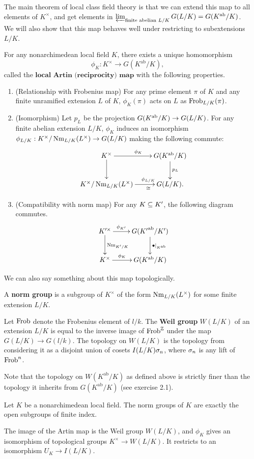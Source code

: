 The main theorem of local class field theory is that we can extend this map to all elements of $K^{\times}$, and get elements in $\varprojlim_{\text{finite abelian }L/K}G(L/K)=G(K^{\text{ab}}/K)$. We will also show that this map behaves well under restricting to subextensions $L/K$.
\begin{thm}
For any nonarchimedean local field $K$, there exists a unique homomorphism
\[
\phi_K:K^{\times} \to G(K^{\text{ab}}/K),
\]
called the $\textbf{local Artin (reciprocity) map}$
with the following properties.
\begin{enumerate}
\item (Relationship with Frobenius map)
For any prime element $\pi$ of $K$ and any finite unramified extension $L$ of $K$, $\phi_K(\pi)$ acts on $L$ as $\operatorname{Frob}_{L/K}(\pi)$.
\item (Isomorphism)
Let $p_{L}$ be the projection $G(K^{\text{ab}}/K)\to G(L/K)$. For any finite abelian extension $L/K$, %
$\phi_K$ induces an isomorphism $\phi_{L/K}:K^{\times}/\operatorname{Nm}_{L/K}(L^{\times})\to G(L/K)$ making the following commute:
\[
\xymatrix{
K^{\times} \ar[r]^{\phi_K}\ar[d] & G(K^{\text{ab}}/K)\ar[d]^{p_L}\\
K^{\times}/\nm_{L/K}(L^{\times})\ar[r]^>>>>{\phi_{L/K}}_>>>>{\cong} & G(L/K).
}
\]
\item (Compatibility with norm map) For any $K\subseteq K'$, the following diagram commutes.
\[
\xymatrix{
K'^{\times} \ar[r]^-{\phi_{K'}} \ar[d]^{\nm_{K'/K}} & G({K'}\abe/K')\ar[d]^{\bullet|_{K\abe}}\\
K^{\times} \ar[r]^-{\phi_{K}}& G(K\abe/K)
}
\]
\end{enumerate}
\end{thm}
We can also say something about this map topologically.
\begin{df}
A \textbf{norm group} is a subgroup of $K^{\times}$ of the form $\operatorname{Nm}_{L/K}(L^{\times})$ for some finite extension $L/K$.

Let $\operatorname{Frob}$ denote the Frobenius element of $l/k$. The \textbf{Weil group} $W(L/K)$ of an extension $L/K$ is equal to the inverse image of $\operatorname{Frob}^{\mathbb{Z}}$ under the map $G(L/K)\to G(l/k)$. The topology on $W(L/K)$ is the topology from considering it as a disjoint union of cosets $I(L/K)\sigma_n$, where $\sigma_n$ is any lift of $\operatorname{Frob}^n$.
\end{df}
Note that the topology on $W(K^{\text{ab}}/K)$ as defined above is strictly finer than the topology it inherits from $G(K^{\text{ab}}/K)$ (see exercise 2.1).
\begin{thm}
Let $K$ be a nonarchimedean local field. The norm groups of $K$ are exactly the open subgroups of finite index.
\end{thm}
\begin{thm}
The image of the Artin map is the Weil group $W(L/K)$, and $\phi_K$ gives an isomorphism of topological groups $K^{\times}\to W(L/K)$. %
It restricts to an isomorphism $U_K\to I(L/K)$.
\end{thm}

